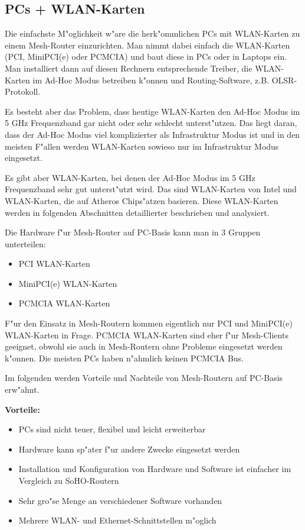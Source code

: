 \subsection{PCs + WLAN-Karten}

Die einfachste M"oglichkeit w"are die herk"ommlichen PCs mit
WLAN-Karten zu einem Mesh-Router einzurichten.  Man nimmt dabei
einfach die WLAN-Karten (PCI, MiniPCI(e) oder PCMCIA) und baut diese
in PCs oder in Laptops ein. Man installiert dann auf diesen Rechnern
entsprechende Treiber, die WLAN-Karten im Ad-Hoc Modus betreiben k"onnen
und Routing-Software, z.B. OLSR-Protokoll.

Es besteht aber das Problem, dass heutige WLAN-Karten den Ad-Hoc Modus im 5 GHz
Frequenzband gar nicht oder sehr schlecht unterst"utzen. Das liegt daran,
dass der Ad-Hoc Modus viel komplizierter als Infrastruktur Modus ist und
in den meisten F"allen werden WLAN-Karten sowieso nur im Infrastruktur Modus
eingesetzt.

Es gibt aber WLAN-Karten, bei denen der Ad-Hoc Modus im 5 GHz Frequenzband
sehr gut unterst"utzt wird. Das sind WLAN-Karten von Intel und WLAN-Karten,
die auf Atheros Chips"atzen basieren. Diese WLAN-Karten werden 
in folgenden Abschnitten detaillierter beschrieben und analysiert.

Die Hardware f"ur Mesh-Router auf PC-Basis kann man in 3 Gruppen unterteilen:

\begin{itemize}
\item PCI WLAN-Karten
\item MiniPCI(e) WLAN-Karten
\item PCMCIA WLAN-Karten
\end{itemize}

F"ur den Einsatz in Mesh-Routern kommen eigentlich nur PCI und MiniPCI(e)
WLAN-Karten in Frage. PCMCIA WLAN-Karten sind eher f"ur Mesh-Clients geeignet,
obwohl sie auch in Mesh-Routern ohne Probleme eingesetzt werden k"onnen.
Die meisten PCs haben n"ahmlich keinen PCMCIA Bus.

Im folgenden werden Vorteile und Nachteile von Mesh-Routern auf PC-Basis
erw"ahnt.

\textbf{Vorteile:}

\begin{itemize} 
\item PCs sind nicht teuer, flexibel und leicht erweiterbar
\item Hardware kann sp"ater f"ur andere Zwecke eingesetzt werden
\item Installation und Konfiguration von Hardware und Software ist einfacher
im Vergleich zu SoHO-Routern
\item Sehr gro"se Menge an verschiedener Software vorhanden
\item Mehrere WLAN- und Ethernet-Schnittstellen m"oglich 
\end{itemize}

